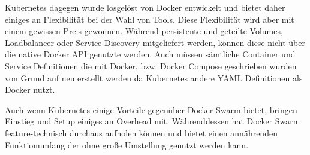 Kubernetes dagegen wurde losgelöst von Docker entwickelt und bietet daher einiges an Flexibilität bei der Wahl von Tools.
Diese Flexibilität wird aber mit einem gewissen Preis gewonnen.
Während persistente und geteilte Volumes, Loadbalancer oder Service Discovery mitgeliefert werden, können diese nicht über die native Docker API genutzte werden.
Auch müssen sämtliche Container und Service Definitionen die mit Docker, bzw. Docker Compose geschrieben wurden von Grund auf neu erstellt werden da Kubernetes andere YAML Definitionen als Docker nutzt.

Auch wenn Kubernetes einige Vorteile gegenüber Docker Swarm bietet, bringen Einstieg und Setup einiges an Overhead mit.
Währenddessen hat Docker Swarm feature-technisch durchaus aufholen können und bietet einen annährenden Funktionumfang der ohne große Umstellung genutzt werden kann.
